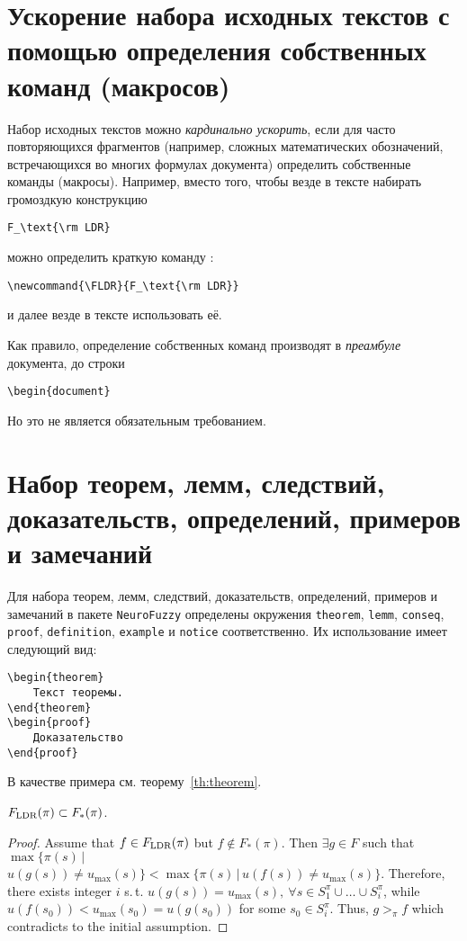 \documentclass[a4paper, 14pt, reqno, oneside]{extbook}
\begin{document}
\section{Ускорение набора исходных текстов с помощью определения собственных команд (макросов)}

Набор исходных текстов можно \emph{кардинально ускорить}, если для часто повторяющихся фрагментов (например, сложных математических обозначений, встречающихся во многих формулах документа) определить собственные команды (макросы). Например, вместо того, чтобы везде в тексте набирать громоздкую конструкцию
\begin{verbatim}
F_\text{\rm LDR}
\end{verbatim}
можно определить краткую команду \texttt{\FLDR}:
\begin{verbatim}
\newcommand{\FLDR}{F_\text{\rm LDR}}
\end{verbatim}
и далее везде в тексте использовать её.

\newcommand{\FLDR}{F_\text{\rm LDR}}

Как правило, определение собственных команд производят в \emph{преамбуле} документа, \te до строки
\begin{verbatim}
\begin{document}
\end{verbatim}
Но это не является обязательным требованием.

\section{Набор теорем, лемм, следствий, доказательств, определений, примеров и замечаний}

Для набора теорем, лемм, следствий, доказательств, определений, примеров и замечаний в пакете \texttt{NeuroFuzzy} определены окружения \texttt{theorem}, \texttt{lemm}, \texttt{conseq}, \texttt{proof}, \texttt{definition}, \texttt{example} и \texttt{notice} соответственно. Их использование имеет следующий вид:
\begin{verbatim}
\begin{theorem}
    Текст теоремы.
\end{theorem}
\begin{proof}
    Доказательство
\end{proof}
\end{verbatim}

В качестве примера см. теорему~\ref{th:theorem}.
\begin{theorem}
\label{th:theorem}
    $\FLDR(\pi) \subset F_*(\pi)$.
\end{theorem}
\begin{proof}
Assume that $f\in\FLDR(\pi)$ but $f\notin F_*(\pi)$. Then $\exists g\in F$ such that $\max \big\{\pi(s) \,\big|$ $u(g(s)) \ne u_{\max}(s) \big\} < \max \big\{\pi(s) \,\big|\, u(f(s)) \ne u_{\max}(s) \big\}$. Therefore, there exists integer $i$ s.\,t. $u(g(s)) = u_{\max}(s),\ \forall s\in S_1^\pi\cup\ldots\cup S_i^\pi$, while $u(f(s_0)) < u_{\max}(s_0) = u(g(s_0))$ for some $s_0\in S_i^\pi$. Thus, $g >_\pi f$ which contradicts to the initial assumption.
\end{proof}
\end{document}

